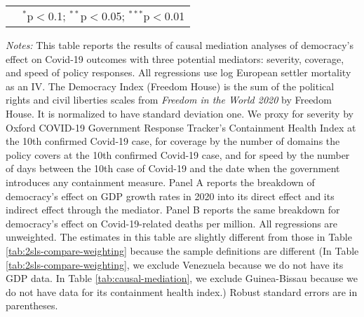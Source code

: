 \begin{table}[!htbp]
\begin{threeparttable}
\begin{tabular}{l*{3}{c}}
\hline\hline
  & \multicolumn{3}{r}{$^{*}$p$<$0.1; $^{**}$p$<$0.05; $^{***}$p$<$0.01} \\ 
\end{tabular}
\begin{tablenotes} 
\item {\footnotesize {\textit{Notes:} This table reports the results of causal mediation analyses of democracy's effect on Covid-19 outcomes with three potential mediators: severity, coverage, and speed of policy responses. All regressions use log European settler mortality as an IV. The Democracy Index (Freedom House) is the sum of the political rights and civil liberties scales from \emph{Freedom in the World 2020} by Freedom House. It is normalized to have standard deviation one. We proxy for severity by Oxford COVID-19 Government Response Tracker's Containment Health Index at the 10th confirmed Covid-19 case, for coverage by the number of domains the policy covers at the 10th confirmed Covid-19 case, and for speed by the number of days between the 10th case of Covid-19 and the date when the government introduces any containment measure.  Panel A reports the breakdown of democracy's effect on GDP growth rates in 2020 into its direct effect and its indirect effect through the mediator. Panel B reports the same breakdown for democracy's effect on Covid-19-related deaths per million. All regressions are unweighted. The estimates in this table are slightly different from those in Table \ref{tab:2sls-compare-weighting} because the sample definitions are different (In Table \ref{tab:2sls-compare-weighting}, we exclude Venezuela because we do not have its GDP data. In Table \ref{tab:causal-mediation}, we exclude Guinea-Bissau because we do not have data for its containment health index.) Robust standard errors are in parentheses.}}
\end{tablenotes}
\end{threeparttable}
\end{table}